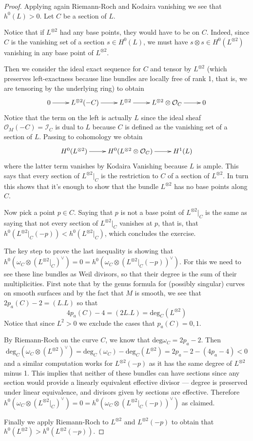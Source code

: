 \begin{proof}
Applying again Riemann-Roch and Kodaira
vanishing we see that $h^0(L)>0$. Let $C$ be
a section of $L$.

Notice that if $L^{\otimes 2}$ had any base
points, they would have to be on $C$. Indeed,
since $C$ is the vanishing set of a section
$s\in H^{0}(L)$, we must have $s \otimes s
\in H^{0}(L^{\otimes 2})$ vanishing in any
base point of $L^{\otimes 2}$.

Then we consider the ideal exact sequence for
$C$ and tensor by $L^{\otimes 2}$ (which
preserves left-exactness because line bundles
are locally free of rank 1, that is, we are
tensoring by the underlying ring) to obtain
$$ \xymatrix{ 0\ar[r]&L^{\otimes
2}(-C)\ar[r]&L^{\otimes 2}\ar[r]& L^{\otimes
2}\otimes\mathcal{O}_C\ar[r]&0 } $$ Notice
that the term on the left is actually $L$
since the ideal sheaf
$\mathcal{O}_M(-C)=\mathcal{I}_C$ is dual to
$L$ because $C$ is defined as the vanishing
set of a section of $L$. Passing to
cohomology we obtain $$ \xymatrix{
H^{0}(L^{\otimes 2})\ar[r]&H^{0}(L^{\otimes
2}\otimes \mathcal{O}_C)\ar[r]& H^{1}(L) } $$
where the latter term vanishes by Kodaira
Vanishing because $L$ is ample. This says
that every section of $L^{\otimes 2}|_C$ is
the restriction to $C$ of a section of
$L^{\otimes 2}$. In turn this shows that it's
enough to show that the bundle $L^{\otimes
2}$ has no base points along $C$.

Now pick a point $p\in C$. Saying
that $p$ is not a base point of $L^{\otimes
2}|_{C}$ is the same as saying that not every
section of $L^{\otimes 2}|_{C}$ vanishes at
$p$, that is, that $h^0(L^{\otimes
2}|_{C}(-p))<h^0(L^{\otimes 2}|_{C})$,
which concludes the exercise.

The key step to prove
the last inequality is showing that
$h^0(\omega_C\otimes(L^{\otimes2}|_{C})^\vee)
=0=h^0(\omega_C\otimes
(L^{\otimes2}|_{C}(-p))^\vee)$. For this we
need to see these line bundles as Weil
divisors, so that their degree is the sum of
their multiplicities. First note that by the
genus formula for (possibly singular) curves
on smooth surfaces and by the fact that $M$
is smooth, we see that $2p_a(C)-2=(L.L)$ so
that
$$
4p_a(C)-4=(2L.L)=\text{deg}_C(L^{\otimes 2})
$$
Notice that since $L^2>0$ we exclude the
cases that $p_a(C)=0,1$.

By Riemann-Roch on the curve
$C$, we know that
$\text{deg}\omega_C=2p_a-2$. Then
$$
\text{deg}_C
(\omega_C\otimes (L^{\otimes2})^\vee)
=\text{deg}_C(\omega_C)-\text{deg}
_C(L^{\otimes
2})
=2p_a-2-(4p_a-4)<0
$$
and a similar computation works for
$L^{\otimes 2}(-p)$ as it has the same
degree of $L^{\otimes 2}$ minus 1. This
implies that neither of these bundles
can have sections since any section would
provide a linearly equivalent
effective divisor
--- degree is preserved under linear
equivalence,
and divisors given by sections are effective.
Therefore
$h^0(\omega_C\otimes
(L^{\otimes2}|_{C})^\vee)=0
=h^0(\omega_C\otimes (L^{\otimes
2}|_{C}(-p))^\vee)$ as claimed.

Finally we apply Riemann-Roch to $L^{\otimes
2}$ and $L^{\otimes 2}(-p)$ to
obtain that $h^0(L^{\otimes
2})>h^0(L^{\otimes 2}(-p))$.
\end{proof}


